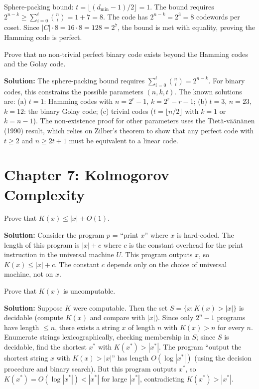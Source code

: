 Sphere-packing bound: $t = \lfloor(d_{\min}-1)/2\rfloor = 1$. The bound requires $2^{n-k} \ge \sum_{i=0}^t \binom{n}{i} = 1 + 7 = 8$. The code has $2^{n-k} = 2^3 = 8$ codewords per coset. Since $|C| \cdot 8 = 16 \cdot 8 = 128 = 2^7$, the bound is met with equality, proving the Hamming code is perfect.

\begin{exercise}[Challenge]
Prove that no non-trivial perfect binary code exists beyond the Hamming codes and the Golay code.
\end{exercise}
\textbf{Solution:} The sphere-packing bound requires $\sum_{i=0}^t \binom{n}{i} = 2^{n-k}$. For binary codes, this constrains the possible parameters $(n,k,t)$. The known solutions are: (a) $t=1$: Hamming codes with $n = 2^r - 1$, $k = 2^r - r - 1$; (b) $t=3$, $n=23$, $k=12$: the binary Golay code; (c) trivial codes ($t = \lfloor n/2 \rfloor$ with $k=1$ or $k=n-1$). The non-existence proof for other parameters uses the Tiet\"a-v\"a\"an\"anen (1990) result, which relies on Zilber's theorem to show that any perfect code with $t \ge 2$ and $n \ge 2t+1$ must be equivalent to a linear code.

\section{Chapter 7: Kolmogorov Complexity}

\begin{exercise}[Basic]
Prove that $K(x) \le |x| + O(1)$.
\end{exercise}
\textbf{Solution:} Consider the program $p$ = ``print $x$'' where $x$ is hard-coded. The length of this program is $|x| + c$ where $c$ is the constant overhead for the print instruction in the universal machine $U$. This program outputs $x$, so $K(x) \le |x| + c$. The constant $c$ depends only on the choice of universal machine, not on $x$.

\begin{exercise}[Intermediate]
Prove that $K(x)$ is uncomputable.
\end{exercise}
\textbf{Solution:} Suppose $K$ were computable. Then the set $S = \{x : K(x) > |x|\}$ is decidable (compute $K(x)$ and compare with $|x|$). Since only $2^{n} - 1$ programs have length $\le n$, there exists a string $x$ of length $n$ with $K(x) > n$ for every $n$. Enumerate strings lexicographically, checking membership in $S$; since $S$ is decidable, find the shortest $x^*$ with $K(x^*) > |x^*|$. The program ``output the shortest string $x$ with $K(x) > |x|$'' has length $O(\log |x^*|)$ (using the decision procedure and binary search). But this program outputs $x^*$, so $K(x^*) = O(\log |x^*|) < |x^*|$ for large $|x^*|$, contradicting $K(x^*) > |x^*|$.

